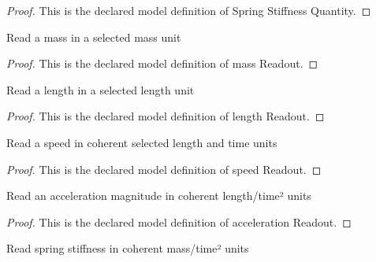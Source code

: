 \begin{proof}
  This is the declared model definition of Spring Stiffness Quantity.
\end{proof}
\begin{definition}
  \label{def:physics:phyx-mini-0765:phyxminiproblems-problemphyxmini0765-massreadout}
  Read a mass in a selected mass unit
\end{definition}
\begin{proof}
  This is the declared model definition of mass Readout.
\end{proof}
\begin{definition}
  \label{def:physics:phyx-mini-0765:phyxminiproblems-problemphyxmini0765-lengthreadout}
  Read a length in a selected length unit
\end{definition}
\begin{proof}
  This is the declared model definition of length Readout.
\end{proof}
\begin{definition}
  \label{def:physics:phyx-mini-0765:phyxminiproblems-problemphyxmini0765-speedreadout}
  Read a speed in coherent selected length and time units
\end{definition}
\begin{proof}
  This is the declared model definition of speed Readout.
\end{proof}
\begin{definition}
  \label{def:physics:phyx-mini-0765:phyxminiproblems-problemphyxmini0765-accelerationreadout}
  Read an acceleration magnitude in coherent length/time² units
\end{definition}
\begin{proof}
  This is the declared model definition of acceleration Readout.
\end{proof}
\begin{definition}
  \label{def:physics:phyx-mini-0765:phyxminiproblems-problemphyxmini0765-stiffnessreadout}
  Read spring stiffness in coherent mass/time² units
\end{definition}
